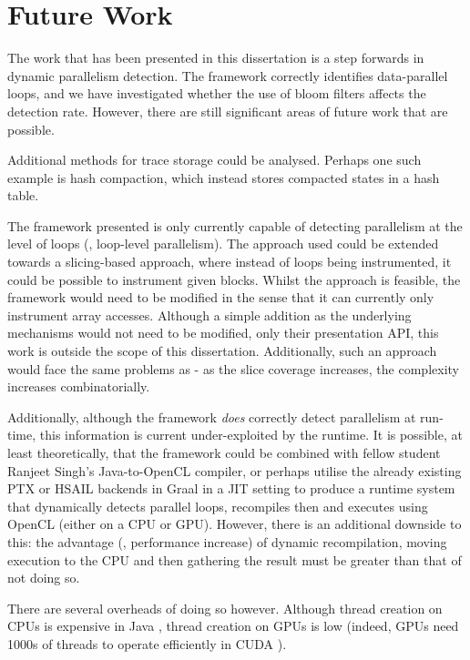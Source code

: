 \section{Future Work} \label{sec:conclusion/future-work}
The work that has been presented in this dissertation is a step forwards in dynamic parallelism detection. The framework correctly identifies data-parallel loops, and we have investigated whether the use of bloom filters affects the detection rate. However, there are still significant areas of future work that are possible.

Additional methods for trace storage could be analysed. Perhaps one such example is hash compaction, which instead stores compacted states in a hash table.

The framework presented is only currently capable of detecting parallelism at the level of loops (\ie, loop-level parallelism). The approach used could be extended towards a slicing-based approach, where instead of loops being instrumented, it could be possible to instrument given blocks. Whilst the approach is feasible, the framework would need to be modified in the sense that it can currently only instrument array accesses. Although a simple addition as the underlying mechanisms would not need to be modified, only their presentation API, this work is outside the scope of this dissertation. Additionally, such an approach would face the same problems as \citet{Wang2009} - as the slice coverage increases, the complexity increases combinatorially. 

Additionally, although the framework \emph{does} correctly detect parallelism at run-time, this information is current under-exploited by the runtime. It is possible, at least theoretically, that the framework could be combined with fellow student Ranjeet Singh's Java-to-OpenCL compiler, or perhaps utilise the already existing PTX or HSAIL backends in Graal in a JIT setting to produce a runtime system that dynamically detects parallel loops, recompiles then and executes using OpenCL (either on a CPU or GPU). However, there is an additional downside to this: the advantage (\ie, performance increase) of dynamic recompilation, moving execution to the CPU and then gathering the result must be greater than that of not doing so.

There are several overheads of doing so however. Although thread creation on CPUs is expensive in Java \citep{JSR133}, thread creation on GPUs is low \citep{Mueller2009} (indeed, GPUs need 1000s of threads to operate efficiently in CUDA \citep{Nvidia2011}).

